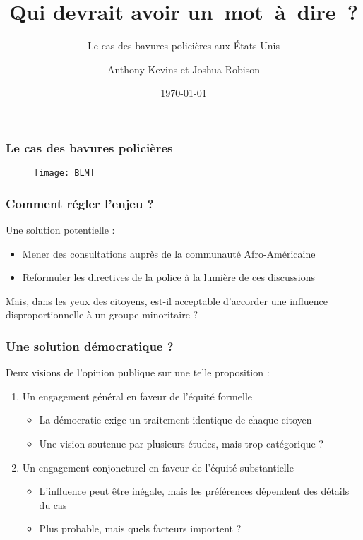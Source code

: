 \documentclass[14pt]{beamer}
\title{Qui devrait avoir un~mot~à~dire~?}
\subtitle{Le cas des bavures policières aux États-Unis}
\author{Anthony Kevins et Joshua Robison}
\date{\today}
\begin{document}
\begin{frame}
\titlepage
\end{frame}

\begin{frame}
	\frametitle{Le cas des bavures policières}
	\begin{figure}
		\texttt{[image: BLM]}
	\end{figure}
\end{frame}

\begin{frame}
\frametitle{Comment régler l'enjeu ?}
Une solution potentielle : 

\begin{itemize}
	\pause
	\item Mener des consultations auprès de la communauté Afro-Américaine
	\pause
	\item Reformuler les directives de la police à la lumière de ces discussions
\end{itemize}
\pause
\bigskip
Mais, dans les yeux des citoyens, est-il acceptable d'accorder une influence disproportionnelle à un groupe minoritaire ?
\end{frame}

\begin{frame}
\frametitle{Une solution démocratique ?}
Deux visions de l'opinion publique sur une telle proposition :
\begin{enumerate}
	\pause 
	\item Un engagement général en faveur de l'équité formelle
	\begin{itemize}
		\pause
		\item La démocratie exige un traitement identique de chaque citoyen
		\pause
		\item Une vision soutenue par plusieurs études, mais trop catégorique ?
	\end{itemize}
	\pause 
	\item Un engagement conjoncturel en faveur de l'équité substantielle
	\begin{itemize}
		\pause 
		\item L'influence peut être inégale, mais les préférences dépendent des détails du cas 
		\pause 
		\item Plus probable, mais quels facteurs importent ?
	\end{itemize}
\end{enumerate}
\end{frame}
\end{document}
